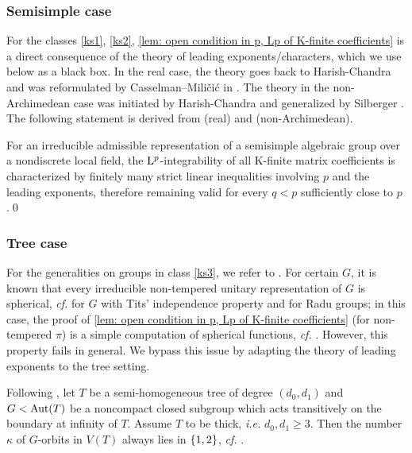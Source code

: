 \documentclass[a4paper, 10pt]{article}
\begin{document}
\subsubsection*{Semisimple case}
For the classes \ref{ks1}, \ref{ks2}, \autoref{lem: open condition in p, Lp of K-finite coefficients} is a direct consequence of the theory of leading exponents/characters, which we use below as a black box.
In the real case, the theory goes back to Harish-Chandra \cite{harish-chandra1959some,harish-chandra1984some,harish-chandra1984differential} and was reformulated by Casselman--Mili\v{c}i\'{c} in \cite{casselman-milicic1982asymptotic}. 
The theory in the non-Archimedean case was initiated by Harish-Chandra \cite{harish-chandra1970harmonic} and generalized by Silberger \cite{silberger1982asymptotics}. 
The following statement is derived from  \cite[Thm 8.14]{casselman-milicic1982asymptotic} (real) and \cite[Prop 2.5]{silberger1982asymptotics} (non-Archimedean).

\begin{lemma}\label{lem: K-finite coeff, from p to q<p, semisimple}
    For an irreducible admissible representation of a semisimple algebraic group over a nondiscrete local field, the $\mathrm{L}^p$-integrability of all K-finite matrix coefficients is characterized by finitely many strict linear inequalities involving $p$ and the leading exponents, therefore remaining valid for every $q<p$ sufficiently close to $p$.\qed
\end{lemma}

\subsubsection*{Tree case}
For the generalities on groups in class \ref{ks3}, we refer to \cite{amann2003groups,semal2023irreducibly}.
For certain $G$, it is known that every irreducible non-tempered unitary representation of $G$ is spherical, \emph{cf.} \cite{amann2003groups} for $G$ with Tits' independence property and \cite{semal2024radu} for Radu groups; in this case, the proof of \autoref{lem: open condition in p, Lp of K-finite coefficients} (for non-tempered $\pi$) is a simple computation of spherical functions, \emph{cf.} \cite[Lem 4.11]{heinig-laat2024group}. However, this property fails in general. We bypass this issue by adapting the theory of leading exponents to the tree setting.

Following \cite[\S4]{heinig-laat2024group}, let $T$ be a semi-homogeneous tree of degree $(d_0,d_1)$ and $G<\mathrm{Aut}(T)$ be a noncompact closed subgroup which acts transitively on the boundary at infinity of $T$. 
Assume $T$ to be thick, \emph{i.e.} $d_0,d_1\geq 3$.
Then the number $\kappa$ of $G$-orbits in $V(T)$ always lies in $\left\{ 1,2 \right\}$, \emph{cf.} \cite[Prop 3.1]{heinig-laat2024group}.
\end{document}
